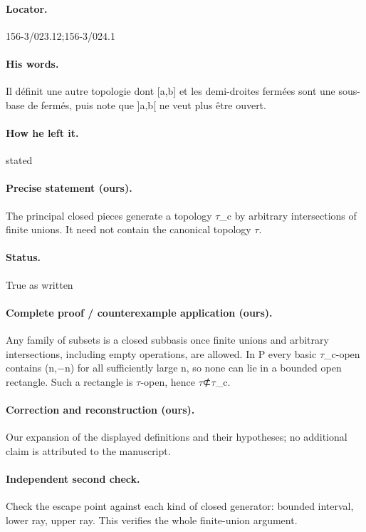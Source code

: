 \paragraph{Locator.} 156-3/023.12;156-3/024.1

\paragraph{His words.} Il définit une autre topologie dont [a,b] et les demi-droites fermées sont une sous-base de fermés, puis note que ]a,b[ ne veut plus être ouvert.

\paragraph{How he left it.} stated

\paragraph{Precise statement (ours).} The principal closed pieces generate a topology \ensuremath{\tau}\_c by arbitrary intersections of finite unions. It need not contain the canonical topology \ensuremath{\tau}.

\paragraph{Status.} True as written

\paragraph{Complete proof / counterexample application (ours).} Any family of subsets is a closed subbasis once finite unions and arbitrary intersections, including empty operations, are allowed. In P every basic \ensuremath{\tau}\_c-open contains (n,\ensuremath{-}n) for all sufficiently large n, so none can lie in a bounded open rectangle. Such a rectangle is \ensuremath{\tau}-open, hence \ensuremath{\tau}⊄\ensuremath{\tau}\_c.

\paragraph{Correction and reconstruction (ours).} Our expansion of the displayed definitions and their hypotheses; no additional claim is attributed to the manuscript.

\paragraph{Independent second check.} Check the escape point against each kind of closed generator: bounded interval, lower ray, upper ray. This verifies the whole finite-union argument.

